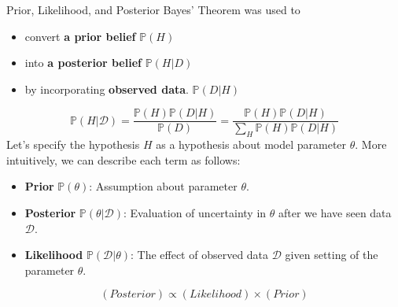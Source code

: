\documentclass{bredelebeamer}
\begin{document}
\begin{frame}{Prior, Likelihood, and Posterior}
  Bayes' Theorem was used to
  \begin{itemize}
    \item convert \textbf{a prior belief} $\mathbb{P}(H)$
    \item into \textbf{a posterior belief} $\mathbb{P}(H|D)$
    \item by incorporating \textbf{observed data}. $\mathbb{P}(D|H)$
  \end{itemize}

  \begin{equation}
    \mathbb{P}(H|\mathcal{D})
      = \frac{\mathbb{P}(H)\mathbb{P}(D|H)}{\mathbb{P}(D)}
      = \frac{\mathbb{P}(H)\mathbb{P}(D|H)}{\sum_H \mathbb{P}(H)\mathbb{P}(D|H)}
  \end{equation}
  \vspace{\baselineskip}
  Let's specify the hypothesis $H$ as a hypothesis about model parameter $\theta$.
  More intuitively, we can describe each term as follows:
  \begin{itemize}
    \item \textbf{Prior} $\mathbb{P}(\theta)$:
      Assumption about parameter $\theta$.
    \item \textbf{Posterior} $\mathbb{P}(\theta|\mathcal{D})$:
      Evaluation of uncertainty in $\theta$ after we have seen data $\mathcal{D}$.
    \item \textbf{Likelihood} $\mathbb{P}(\mathcal{D}|\theta)$:
      The effect of observed data $\mathcal{D}$ given setting of the parameter $\theta$.
  \end{itemize}

  \begin{equation}
    (\mathit{Posterior}) \propto (\mathit{Likelihood}) \times (\mathit{Prior})
  \end{equation}
\end{frame}
\end{document}
